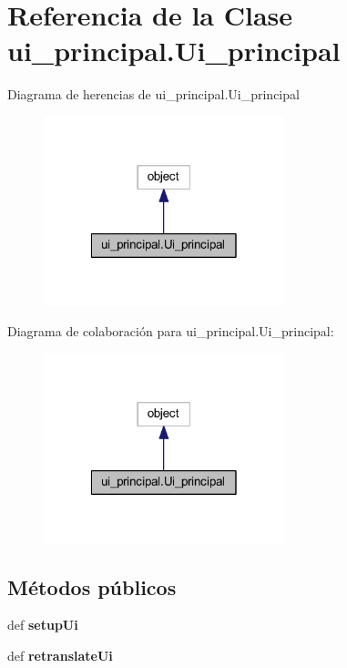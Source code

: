 \section{Referencia de la Clase ui\-\_\-principal.\-Ui\-\_\-principal}
\label{classui__principal_1_1_ui__principal}


Diagrama de herencias de ui\-\_\-principal.\-Ui\-\_\-principal\nopagebreak
\begin{figure}[H]
\begin{center}
\leavevmode
\includegraphics[width=198pt]{classui__principal_1_1_ui__principal__inherit__graph}
\end{center}
\end{figure}


Diagrama de colaboración para ui\-\_\-principal.\-Ui\-\_\-principal\-:\nopagebreak
\begin{figure}[H]
\begin{center}
\leavevmode
\includegraphics[width=198pt]{classui__principal_1_1_ui__principal__coll__graph}
\end{center}
\end{figure}
\subsection*{Métodos públicos}
\begin{DoxyCompactItemize}
\item 
def {\bfseries setup\-Ui}\label{classui__principal_1_1_ui__principal_ac17bf1466124c2281fdb0f66b93a870c}

\item 
def {\bfseries retranslate\-Ui}\label{classui__principal_1_1_ui__principal_a4890cc7d503f59a780876abc379797f3}

\end{DoxyCompactItemize}
